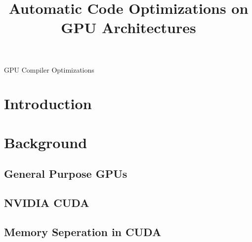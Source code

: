 \documentclass[conference]{IEEEtran}
\begin{document}
\title{Automatic Code Optimizations on GPU Architectures}

\author{
}


\maketitle

\begin{abstract}

\end{abstract}

\begin{IEEEkeywords}
GPU Compiler Optimizations
\end{IEEEkeywords}

\section{Introduction}

	

\section{Background}

	\subsection{General Purpose GPUs}
	
		
	\subsection{NVIDIA CUDA}
		
	
	\subsection{Memory Seperation in CUDA}
		
\end{document}
